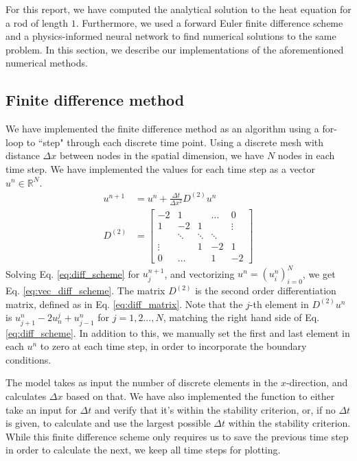 For this report, we have computed the analytical solution to the heat equation for a rod of length $1$. 
Furthermore, we used a forward Euler finite difference scheme and a physics-informed neural network to find numerical solutions to the same problem. 
In this section, we describe our implementations of the aforementioned numerical methods. 

\subsection{Finite difference method}

We have implemented the finite difference method as an algorithm using a for-loop to ``step" through each discrete time point.
Using a discrete mesh with distance $\Delta x$ between nodes in the spatial dimension,
we have $N$ nodes in each time step.
We have implemented the values for each time step as a vector $u^n \in \mathbb{R}^{N}$.
\begin{align}
    \label{eq:vec_diff_scheme}
    u^{n+1} &= u^n + \frac{\Delta t}{\Delta x^2} D^{(2)}u^n \\
    \label{eq:diff_matrix}
    D^{(2)} &= 
    \begin{bmatrix}
    -2  & 1     &       &    \dots    &   0    \\
     1 & -2 & 1 &  &    \vdots    \\
     & \ddots & \ddots & \ddots & \\
     \vdots &     & 1 & -2 & 1 \\
     0&     \dots      &      & 1     & -2
    \end{bmatrix}
\end{align}
Solving Eq. \ref{eq:diff_scheme} for $u_j^{n+1}$, and vectorizing $u^n = (u^n_i)_{i=0}^N$, we get Eq. \ref{eq:vec_diff_scheme}.
The matrix $D^{(2)}$ is the second order differentiation matrix, defined as in Eq. \ref{eq:diff_matrix}.
Note that the $j$-th element in $D^{(2)}u^n$ is $u_{j+1}^n - 2u_n^j + u_{j-1}^n$ for $j = 1,2...,N$, matching the right hand side of Eq. \ref{eq:diff_scheme}.
In addition to this, we manually set the first and last element in each $u^n$ to zero at each time step, in order to incorporate the boundary conditions.

The model takes as input the number of discrete elements in the $x$-direction, and calculates $\Delta x$ based on that.
We have also implemented the function to either take an input for $\Delta t$ and verify that it's within the stability criterion, or, if no $\Delta t$ is given, to calculate and use the largest possible $\Delta t$ within the stability criterion.
While this finite difference scheme only requires us to save the previous time step in order to calculate the next, we keep all time steps for plotting.

